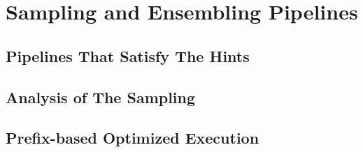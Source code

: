 \section{Sampling and Ensembling Pipelines}
\subsection{Pipelines That Satisfy The Hints}
\subsection{Analysis of The Sampling}
\subsection{Prefix-based Optimized Execution}
